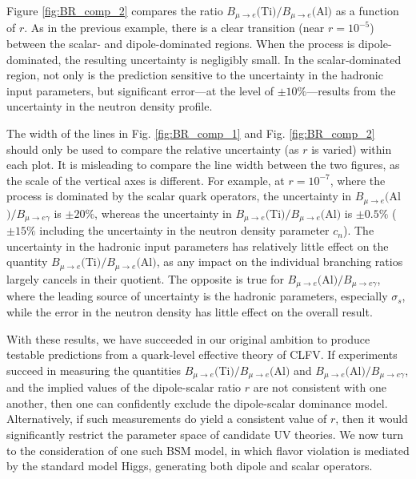 \documentclass{book}[letterpaper,12pt]
\begin{document}
Figure \ref{fig:BR_comp_2} compares the ratio $B_{\mu\rightarrow e}($Ti$)/B_{\mu\rightarrow e}($Al$)$ as a function of $r$. As in the previous example, there is a clear transition (near $r=10^{-5}$) between the scalar- and dipole-dominated regions. When the process is dipole-dominated, the resulting uncertainty is negligibly small. In the scalar-dominated region, not only is the prediction sensitive to the uncertainty in the hadronic input parameters, but significant error---at the level of $\pm 10\%$---results from the uncertainty in the neutron density profile. 

The width of the lines in Fig. \ref{fig:BR_comp_1} and Fig. \ref{fig:BR_comp_2} should only be used to compare the relative uncertainty (as $r$ is varied) within each plot. It is misleading to compare the line width between the two figures, as the scale of the vertical axes is different. For example, at $r=10^{-7}$, where the process is dominated by the scalar quark operators, the uncertainty in $B_{\mu\rightarrow e}($Al$)/B_{\mu\rightarrow e\gamma}$ is $\pm 20\%$, whereas the uncertainty in $B_{\mu\rightarrow e}($Ti$)/B_{\mu\rightarrow e}($Al$)$ is $\pm 0.5\%$ ($\pm 15\%$ including the uncertainty in the neutron density parameter $c_n$). The uncertainty in the hadronic input parameters has relatively little effect on the quantity $B_{\mu\rightarrow e}($Ti$)/B_{\mu\rightarrow e}($Al$)$, as any impact on the individual branching ratios largely cancels in their quotient. The opposite is true for $B_{\mu\rightarrow e}($Al$)/B_{\mu\rightarrow e\gamma}$, where the leading source of uncertainty is the hadronic parameters, especially $\sigma_s$, while the error in the neutron density has little effect on the overall result.

With these results, we have succeeded in our original ambition to produce testable predictions from a quark-level effective theory of CLFV. If experiments succeed in measuring the quantities $B_{\mu\rightarrow e}($Ti$)/B_{\mu\rightarrow e}($Al$)$ and $B_{\mu\rightarrow e}($Al$)/B_{\mu\rightarrow e\gamma}$, and the implied values of the dipole-scalar ratio $r$ are not consistent with one another, then one can confidently exclude the dipole-scalar dominance model. Alternatively, if such measurements do yield a consistent value of $r$, then it would significantly restrict the parameter space of candidate UV theories. We now turn to the consideration of one such BSM model, in which flavor violation is mediated by the standard model Higgs, generating both dipole and scalar operators.
\end{document}

